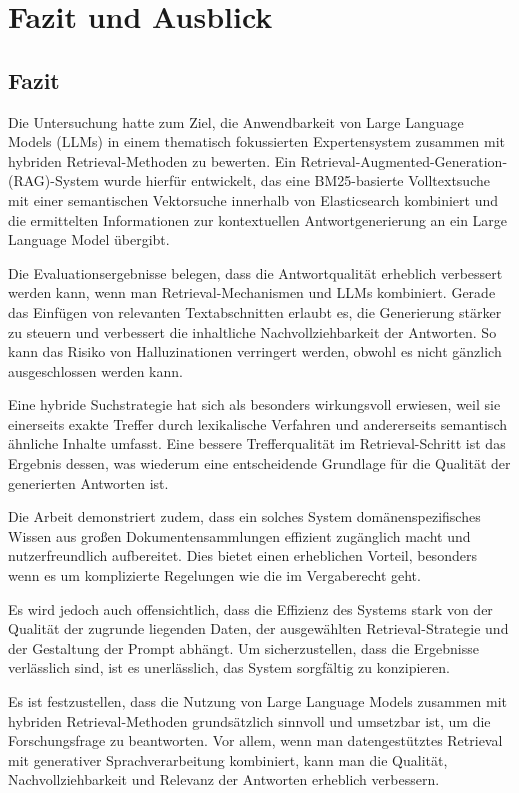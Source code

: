 \section{Fazit und Ausblick} 
\subsection{Fazit}
Die Untersuchung hatte zum Ziel, die Anwendbarkeit von Large Language Models (LLMs) in einem thematisch fokussierten Expertensystem zusammen mit hybriden Retrieval-Methoden zu bewerten. Ein Retrieval-Augmented-Generation-(RAG)-System wurde hierfür entwickelt, das eine BM25-basierte Volltextsuche mit einer semantischen Vektorsuche innerhalb von Elasticsearch kombiniert und die ermittelten Informationen zur kontextuellen Antwortgenerierung an ein Large Language Model übergibt.  

Die Evaluationsergebnisse belegen, dass die Antwortqualität erheblich verbessert werden kann, wenn man Retrieval-Mechanismen und LLMs kombiniert. Gerade das Einfügen von relevanten Textabschnitten erlaubt es, die Generierung stärker zu steuern und verbessert die inhaltliche Nachvollziehbarkeit der Antworten. So kann das Risiko von Halluzinationen verringert werden, obwohl es nicht gänzlich ausgeschlossen werden kann.  

Eine hybride Suchstrategie hat sich als besonders wirkungsvoll erwiesen, weil sie einerseits exakte Treffer durch lexikalische Verfahren und andererseits semantisch ähnliche Inhalte umfasst. Eine bessere Trefferqualität im Retrieval-Schritt ist das Ergebnis dessen, was wiederum eine entscheidende Grundlage für die Qualität der generierten Antworten ist.  

Die Arbeit demonstriert zudem, dass ein solches System domänenspezifisches Wissen aus großen Dokumentensammlungen effizient zugänglich macht und nutzerfreundlich aufbereitet.  Dies bietet einen erheblichen Vorteil, besonders wenn es um komplizierte Regelungen wie die im Vergaberecht geht.  

Es wird jedoch auch offensichtlich, dass die Effizienz des Systems stark von der Qualität der zugrunde liegenden Daten, der ausgewählten Retrieval-Strategie und der Gestaltung der Prompt abhängt.  Um sicherzustellen, dass die Ergebnisse verlässlich sind, ist es unerlässlich, das System sorgfältig zu konzipieren. 

Es ist festzustellen, dass die Nutzung von Large Language Models zusammen mit hybriden Retrieval-Methoden grundsätzlich sinnvoll und umsetzbar ist, um die Forschungsfrage zu beantworten. Vor allem, wenn man datengestütztes Retrieval mit generativer Sprachverarbeitung kombiniert, kann man die Qualität, Nachvollziehbarkeit und Relevanz der Antworten erheblich verbessern.  

